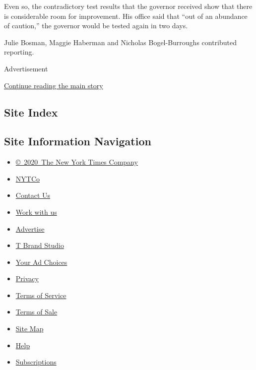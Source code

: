 Even so, the contradictory test results that the governor received show
that there is considerable room for improvement. His office said that
``out of an abundance of caution,'' the governor would be tested again
in two days.

Julie Bosman, Maggie Haberman and Nicholas Bogel-Burroughs contributed
reporting.

Advertisement

\protect\hyperlink{after-bottom}{Continue reading the main story}

\hypertarget{site-index}{%
\subsection{Site Index}\label{site-index}}

\hypertarget{site-information-navigation}{%
\subsection{Site Information
Navigation}\label{site-information-navigation}}

\begin{itemize}
\tightlist
\item
  \href{https://help.nytimes3xbfgragh.onion/hc/en-us/articles/115014792127-Copyright-notice}{©~2020~The
  New York Times Company}
\end{itemize}

\begin{itemize}
\tightlist
\item
  \href{https://www.nytco.com/}{NYTCo}
\item
  \href{https://help.nytimes3xbfgragh.onion/hc/en-us/articles/115015385887-Contact-Us}{Contact
  Us}
\item
  \href{https://www.nytco.com/careers/}{Work with us}
\item
  \href{https://nytmediakit.com/}{Advertise}
\item
  \href{http://www.tbrandstudio.com/}{T Brand Studio}
\item
  \href{https://www.nytimes3xbfgragh.onion/privacy/cookie-policy\#how-do-i-manage-trackers}{Your
  Ad Choices}
\item
  \href{https://www.nytimes3xbfgragh.onion/privacy}{Privacy}
\item
  \href{https://help.nytimes3xbfgragh.onion/hc/en-us/articles/115014893428-Terms-of-service}{Terms
  of Service}
\item
  \href{https://help.nytimes3xbfgragh.onion/hc/en-us/articles/115014893968-Terms-of-sale}{Terms
  of Sale}
\item
  \href{https://spiderbites.nytimes3xbfgragh.onion}{Site Map}
\item
  \href{https://help.nytimes3xbfgragh.onion/hc/en-us}{Help}
\item
  \href{https://www.nytimes3xbfgragh.onion/subscription?campaignId=37WXW}{Subscriptions}
\end{itemize}

